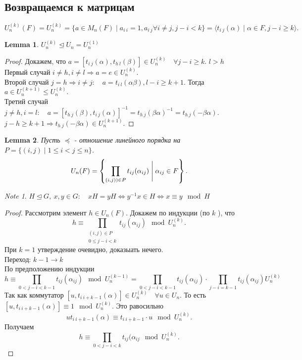 \documentclass[11pt]{book}
\theoremstyle{definition}
\theoremstyle{plain}
\theoremstyle{plain}
\newtheorem*{lm}{Lemma}
\theoremstyle{definition}
\theoremstyle{remark}
\newtheorem*{note}{Note}
\begin{document}
\subsection{Возвращаемся к матрицам}
\[
    U^{(k)}_n (F) = U_n ^{(k)} = \{a \in  M_n(F) \mid a_{i~i} = 1, a_{i~j} \forall i \ne j, j-i < k\} = \langle t_{i ~j}(\alpha ) \mid \alpha  \in F, j - i \ge k \rangle
.\] 
\begin{lm}
    $U_n^{(k)} \trianglelefteq U_n = U_n^{(1)}$
\end{lm}
\begin{proof}
    Докажем, что $a = [t_{i~j}(\alpha ), t_{h~l} (\beta )] \in  U_n^{(k)} \quad \forall j - i \ge  k$. $l > h$\\
    Первый случай $i \ne h, i \ne l \Rightarrow a = e \in  U_n^{(k)}$. \\
    Второй случай $j = h \Rightarrow  i \ne j: \quad a =t_{i~l}(\alpha  \beta ), l -i \ge  k+1$. Тогда $a \in U_n^{(k+1)} \le  U_n^{(k)}$.\\
    Третий случай $j \ne h, i=l: \quad a = [t_{h~j}(\beta ), t_{i~j}(\alpha )]^{-1} = t_{h~j}(\beta  \alpha )^{-1} = t_{h~j}(-\beta \alpha )$. $j -h \ge k+1 \Rightarrow  t_{h~j}(-\beta \alpha ) \in  U_n^{(k+1)}$.
\end{proof}
\begin{lm}
    Пусть  $\preccurlyeq$ - отношение линейного порядка на $P = \{(i, j) \mid 1 \le  i < j \le  n\}$.
    \[
	U_n(F) = \left\{\prod\limits_{(i, j)) \in  P} t_{ij} (\alpha _{ij})\Biggm| \alpha _{ij} \in F\right\}
    .\] 
\end{lm}
\begin{note}
    $H \trianglelefteq G, ~x, y \in  G: \quad xH = y H \Leftrightarrow y^{-1}x \in  H \Leftrightarrow x \equiv y \mod H $
\end{note}
\begin{proof}
    Рассмотрим элемент $h \in  U_n(F)$. Докажем по индукции (по $k$ ), что 
    \[
    h \equiv \prod\limits_{
	\begin{array}{c}
	    (i, j) \in  P \\
	    0 \le  j - i < k
    \end{array}}
    t_{ij}(\alpha _{ij}) \mod U_n^{(k)}
    .\] 
    При $k = 1$ утверждение очевидно, доказыать нечего. \\
    Переход: $k-1 \to  k$ \\
    По предположению индукции $$h \equiv \prod\limits_{0< j - i < k-1}t_{ij}(\alpha _{ij}) \mod U^{(k-1)}_n =
    \prod\limits_{0<j-i< k-1}t_{ij} (\alpha _{ij}) \cdot \prod\limits_{j -i = k-1} t_{ij} (\alpha _{ij}) U_n^{(k)}$$
	Так как коммутатор $[u, t_{i ~ i+k-1} (\alpha )] \in  U_n^{(k)} \quad \forall u \in  U_n$. То есть $[u, t_{i~ i+k-1} (\alpha )] \equiv 1 \mod U_n^{(k)}$. 
	Это равосильно \[
	    ut_{i~i+k-1} (\alpha ) \equiv t_{i~i+k-1} \cdot u \mod U_n^{(k)}
	.\] 
	Получаем
	\[
	    h \equiv \prod\limits_{0<j-i<k} t_{ij}(\alpha _{ij} \mod U_n^{(k)}
	.\] 

\end{proof}
\end{document}
